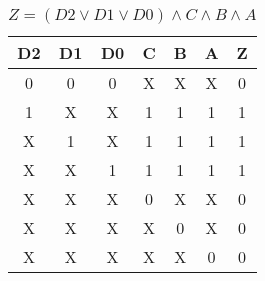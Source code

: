 
\begin{center}
    \begin{table}[h] \caption{\(Z = (D2 \lor D1 \lor D0) \land C \land B \land A \)}
        \begin{center}
            \begin{tabular}{|c|c|c|c|c|c||c|} \hline
            D2 & D1 & D0 & C & B & A & Z \\ \hline\hline
            0  & 0  & 0  & X & X & X & 0 \\ \hline
            1  & X  & X  & 1 & 1 & 1 & 1 \\ \hline
            X  & 1  & X  & 1 & 1 & 1 & 1 \\ \hline
            X  & X  & 1  & 1 & 1 & 1 & 1 \\ \hline
            X  & X  & X  & 0 & X & X & 0 \\ \hline
            X  & X  & X  & X & 0 & X & 0 \\ \hline
            X  & X  & X  & X & X & 0 & 0 \\ \hline
            \end{tabular}
        \end{center}
    \end{table}
\end{center}
